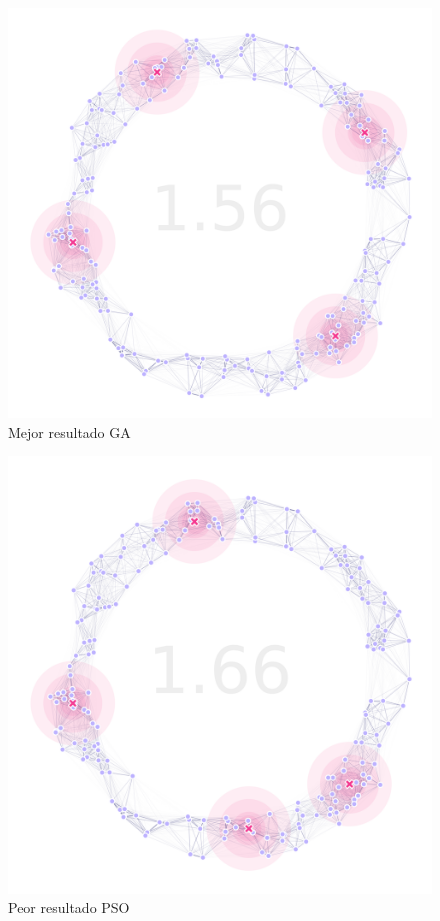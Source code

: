 \documentclass[letterpaper]{report}
\begin{document}
    \begin{figure}[ht!]
      \centering
      \includegraphics[width=\textwidth]{ga-best.png}
      \caption{Mejor resultado GA}
      \label{fig:ga-best}
    \end{figure}

    \begin{figure}[ht!]
      \centering
      \includegraphics[width=\textwidth]{pso-worst.png}
      \caption{Peor resultado PSO}
      \label{fig:pso-worst}
    \end{figure}
\end{document}
